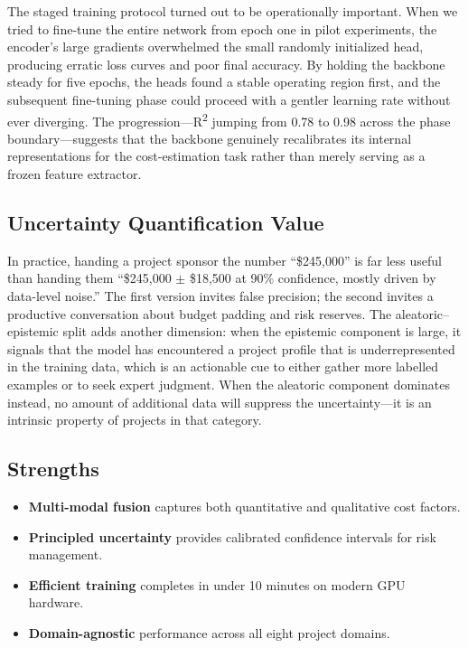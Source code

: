 \documentclass[conference]{IEEEtran}
\begin{document}
The staged training protocol turned out to be operationally important. When we tried to fine-tune the entire network from epoch one in pilot experiments, the encoder's large gradients overwhelmed the small randomly initialized head, producing erratic loss curves and poor final accuracy. By holding the backbone steady for five epochs, the heads found a stable operating region first, and the subsequent fine-tuning phase could proceed with a gentler learning rate without ever diverging. The progression---R\textsuperscript{2} jumping from 0.78 to 0.98 across the phase boundary---suggests that the backbone genuinely recalibrates its internal representations for the cost-estimation task rather than merely serving as a frozen feature extractor.

\subsection{Uncertainty Quantification Value}

In practice, handing a project sponsor the number ``\$245,000'' is far less useful than handing them ``\$245,000 $\pm$ \$18,500 at 90\% confidence, mostly driven by data-level noise.'' The first version invites false precision; the second invites a productive conversation about budget padding and risk reserves. The aleatoric--epistemic split adds another dimension: when the epistemic component is large, it signals that the model has encountered a project profile that is underrepresented in the training data, which is an actionable cue to either gather more labelled examples or to seek expert judgment. When the aleatoric component dominates instead, no amount of additional data will suppress the uncertainty---it is an intrinsic property of projects in that category.

\subsection{Strengths}

\begin{itemize}
    \item \textbf{Multi-modal fusion} captures both quantitative and qualitative cost factors.
    \item \textbf{Principled uncertainty} provides calibrated confidence intervals for risk management.
    \item \textbf{Efficient training} completes in under 10 minutes on modern GPU hardware.
    \item \textbf{Domain-agnostic} performance across all eight project domains.
\end{itemize}
\end{document}
